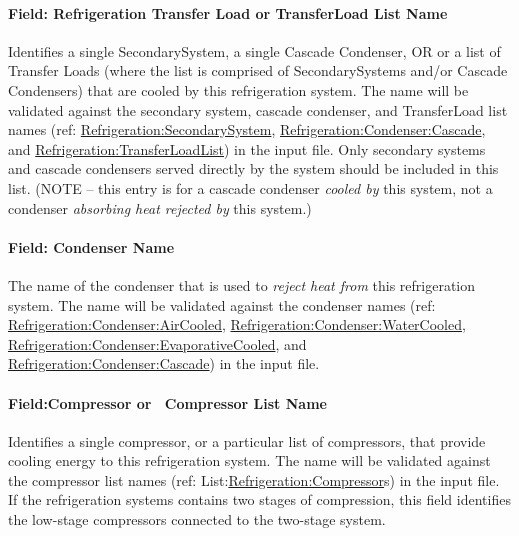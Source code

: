 \paragraph{Field: Refrigeration Transfer Load or TransferLoad List Name}\label{field-refrigeration-transfer-load-or-transferload-list-name}

Identifies a single SecondarySystem, a single Cascade Condenser, OR or a list of Transfer Loads (where the list is comprised of SecondarySystems and/or Cascade Condensers) that are cooled by this refrigeration system. The name will be validated against the secondary system, cascade condenser, and TransferLoad list names (ref: \hyperref[refrigerationsecondarysystem]{Refrigeration:SecondarySystem}, \hyperref[refrigerationcondensercascade]{Refrigeration:Condenser:Cascade}, and \hyperref[refrigerationtransferloadlist]{Refrigeration:TransferLoadList}) in the input file. Only secondary systems and cascade condensers served directly by the system should be included in this list. (NOTE -- this entry is for a cascade condenser \emph{cooled by} this system, not a condenser \emph{absorbing heat rejected by} this system.)

\paragraph{Field: Condenser Name}\label{field-condenser-name}

The name of the condenser that is used to \emph{reject heat from} this refrigeration system. The name will be validated against the condenser names (ref: \hyperref[refrigerationcondenseraircooled]{Refrigeration:Condenser:AirCooled}, \hyperref[refrigerationcondenserwatercooled]{Refrigeration:Condenser:WaterCooled}, \hyperref[refrigerationcondenserevaporativecooled]{Refrigeration:Condenser:EvaporativeCooled}, and \hyperref[refrigerationcondensercascade]{Refrigeration:Condenser:Cascade}) in the input file.

\paragraph{Field:Compressor or ~Compressor List Name}\label{fieldcompressor-or-compressor-list-name}

Identifies a single compressor, or a particular list of compressors, that provide cooling energy to this refrigeration system. The name will be validated against the compressor list names (ref: List:\hyperref[refrigerationcompressor]{Refrigeration:Compressor}s) in the input file.~ If the refrigeration systems contains two stages of compression, this field identifies the low-stage compressors connected to the two-stage system.

